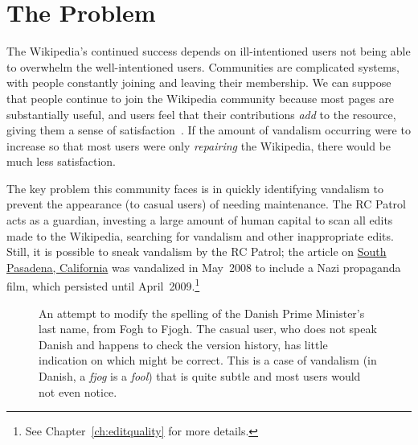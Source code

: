 \section{The Problem}

The Wikipedia's continued success depends on ill-intentioned users
not being able to overwhelm the well-intentioned users.
Communities are complicated systems, with people constantly joining and
leaving their membership.
We can suppose that people continue to
join the Wikipedia community because most pages are
substantially useful, and users feel that their contributions
\textit{add} to the resource,
giving them a sense of satisfaction~\cite{Benkler2002}.
If the amount of vandalism occurring were to increase so that
most users were only \textit{repairing} the Wikipedia, there
would be much less satisfaction.

The key problem this community faces is in quickly identifying vandalism
to prevent the appearance (to casual users)
of needing maintenance.
The RC Patrol~\cite{wiki:RCPatrol} acts as a guardian,
investing a large amount of human capital to scan all
edits made to the Wikipedia, searching for vandalism and
other inappropriate edits.
Still, it is possible to sneak vandalism by the
RC Patrol; the article on \underline{South Pasadena, California}
was vandalized in May~2008 to include a Nazi propaganda film,
which persisted until April~2009.\footnote{See Chapter~\ref{ch:editquality}
for more details.}

\begin{figure}[t]
\centering
{}
\hspace{1ex}
\caption[An example of vandalism which is not obvious to the casual reader]{%
  An attempt to modify the
  spelling of the Danish Prime Minister's last name, from Fogh to Fjogh.
  The casual user, who does not speak Danish and happens to check
  the version history, has little indication on which might be correct.
  This is a case of vandalism
  (in Danish, a \textit{fjog} is a \textit{fool})
  that is quite subtle and most users would not even notice.}
\label{fig-denmark}
\end{figure}


